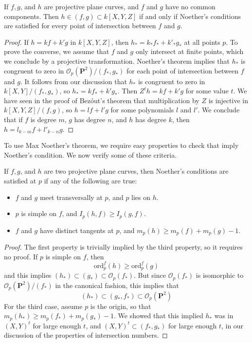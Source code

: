 \begin{theorem}
    If $f,g$, and $h$ are projective plane curves, and $f$ and $g$ have no common components. Then $h \in (f,g) \subset k[X,Y,Z]$ if and only if Noether's conditions are satisfied for every point of intersection between $f$ and $g$.
\end{theorem}
\begin{proof}
    If $h = kf + k'g$ in $k[X,Y,Z]$, then $h_* = k_*f_* + k'_* g_*$ at all points $p$. To prove the converse, we assume that $f$ and $g$ only intersect at finite points, which we conclude by a projective transformation. Noether's theorem implies that $h_*$ is congruent to zero in $\mathcal{O}_p(\mathbf{P}^2)/(f_*,g_*)$ for each point of intersection between $f$ and $g$. It follows from our discussion that $h_*$ is congruent to zero in $k[X,Y]/(f_*,g_*)$, so $h_* = kf_* + k'g_*$. Then $Z^th = kf + k'g$ for some value $t$. We have seen in the proof of Bez\'{o}ut's theorem that multiplication by $Z$ is injective in $k[X,Y,Z]/(f,g)$, so $h = lf + l'g$ for some polynomials $l$ and $l'$. We conclude that if $f$ is degree $m$, $g$ has degree $n$, and $h$ has degree $k$, then $h = l_{k-m}f + l'_{k-n}g$.
\end{proof}

To use Max Noether's theorem, we require easy properties to check that imply Noether's condition. We now verify some of these criteria.

\begin{theorem}
    If $f,g$, and $h$ are two projective plane curves, then Noether's conditions are satisfied at $p$ if any of the following are true:
    \begin{itemize}
        \item $f$ and $g$ meet transversally at $p$, and $p$ lies on $h$.
        \item $p$ is simple on $f$, and $I_p(h,f) \geq I_p(g,f)$.
        \item $f$ and $g$ have distinct tangents at $p$, and $m_p(h) \geq m_p(f) + m_p(g) - 1$.
    \end{itemize}
\end{theorem}
\begin{proof}
    The first property is trivially implied by the third property, so it requires no proof. If $p$ is simple on $f$, then
    \[ \text{ord}_p^f(h) \geq \text{ord}_p^f(g) \]
    and this implies $(h_*) \subset (g_*) \subset \mathcal{O}_p(f_*)$. But since $\mathcal{O}_p(f_*)$ is isomorphic to $\mathcal{O}_p(\mathbf{P}^2)/(f_*)$ in the canonical fashion, this implies that
    \[ (h_*) \subset (g_*,f_*) \subset \mathcal{O}_p(\mathbf{P}^2) \]
    For the third case, assume $p$ is the origin, so that $m_p(h_*) \geq m_p(f_*) + m_p(g_*) - 1$. We showed that this implied $h_*$ was in $(X,Y)^t$ for large enough $t$, and $(X,Y)^t \subset (f_*,g_*)$ for large enough $t$, in our discussion of the properties of intersection numbers.
\end{proof}

